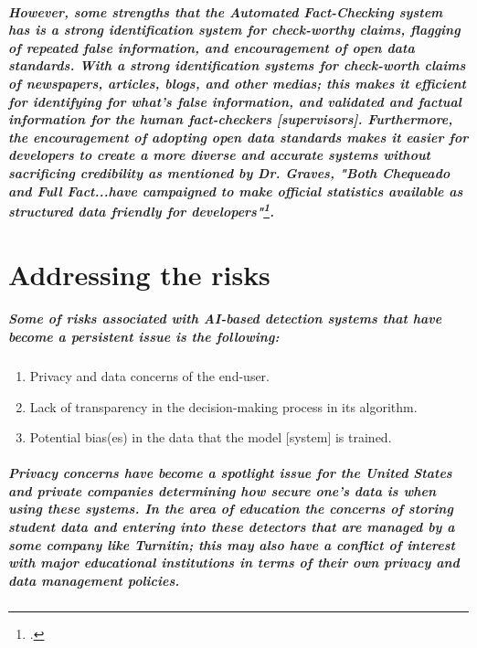\documentclass[12pt,letterpaper,final]{report}
\begin{document}
\paragraph{
However, some strengths that the Automated Fact-Checking system has is a strong identification system for check-worthy claims, flagging of repeated false information, and encouragement of open data standards. With a strong identification systems for check-worth claims of newspapers, articles, blogs, and other medias; this makes it efficient for identifying for what's false information, and validated and factual information for the human fact-checkers [supervisors]. Furthermore, the encouragement of adopting open data standards makes it easier for developers to create a more diverse and accurate systems without sacrificing credibility as mentioned by Dr. Graves, "Both Chequeado and Full Fact...have campaigned to make official statistics available as structured data friendly for developers"\footcite{Graves:2018aa}.
}
\chapter{Addressing the risks}
\paragraph{
Some of risks associated with AI-based detection systems that have become a persistent issue is the following:}

\begin{enumerate}
\item Privacy and data concerns of the end-user.
\item Lack of transparency in the decision-making process in its algorithm.
\item Potential bias(es) in the data that the model [system] is trained.
\end{enumerate}

\paragraph{
Privacy concerns have become a spotlight issue for the United States and private companies determining how secure one's data is when using these systems. In the area of education the concerns of storing student data and entering into these detectors that are managed by a some company like Turnitin; this may also have a conflict of interest with major educational institutions in terms of their own privacy and data management policies.
}
\end{document}
